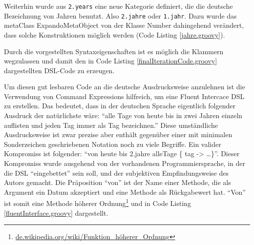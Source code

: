 \documentclass[11pt,english,ngerman, headsepline]{scrreprt}
\begin{document}
Weiterhin wurde aus \texttt{2.years} eine neue Kategorie definiert, die die
deutsche Bezeichnung von Jahren benutzt. Also \texttt{2.jahre} oder
\texttt{1.jahr}.
Dazu wurde das metaClass ExpandoMetaObject von der Klasse Number
dahingehend verändert, dass solche Konstruktionen möglich werden (Code Listing
 \ref{jahre.groovy}).



Durch die vorgestellten Syntaxeigenschaften ist es möglich die Klammern
wegzulassen und damit den in Code Listing \ref{finalIterationCode.groovy}
dargestellten DSL-Code zu erzeugen.



Um diesen gut lesbaren Code an die deutsche Ausdrucksweise anzulehnen
ist die Verwendung von Command Expressions hilfreich, um eine Fluent
Intercace \cite{fowler2005fluent} DSL zu erstellen. Das bedeutet, dass in der
deutschen Sprache eigentlich folgender Ausdruck der natürlichste wäre: ``alle
Tage von heute bis in zwei Jahren einzeln auflisten und jeden Tag immer als Tag
bezeichnen.'' Diese umständliche Ausdrucksweise ist zwar prezise aber enthält
gegenüber einer mit minimalen Sonderzeichen geschriebenen Notation noch zu viele Begriffe.
Ein valider Kompromiss ist folgender: ``von heute bis 2.jahre alleTage \{ tag
-> \ldots\}''.
Dieser Kompromiss wurde ausgehend von der vorhandenen Programmiersprache, in der
die DSL ``eingebettet'' sein soll, und der subjektiven Empfindungsweise des
Autors gemacht. 
Die Präposition ``von'' ist der Name einer Methode, die als Argument ein Datum
akzeptiert und eine Methode als Rückgabewert hat.
``Von'' ist somit eine Methode höherer
Ordnung\footnote{ \url{de.wikipedia.org/wiki/Funktion_höherer_Ordnung} } und
in Code Listing \ref{fluentInterface.groovy} dargestellt.


\end{document}
